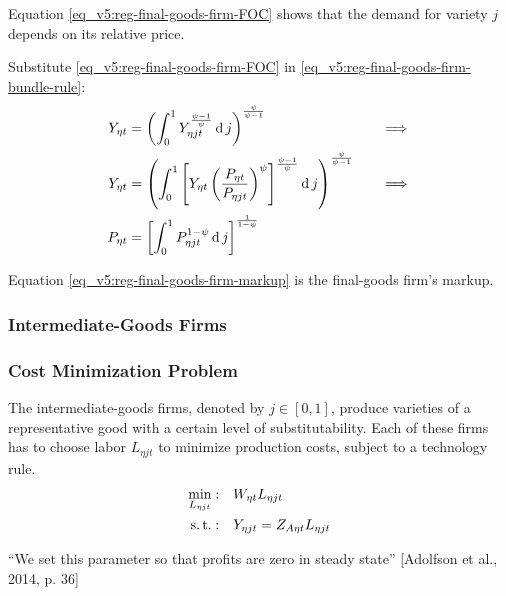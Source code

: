 \documentclass[../thesis.tex]{subfiles}
\begin{document}
Equation \ref{eq_v5:reg-final-goods-firm-FOC} shows that the demand for variety $j$ depends on its relative price. 

Substitute \ref{eq_v5:reg-final-goods-firm-FOC} in \ref{eq_v5:reg-final-goods-firm-bundle-rule}:
\begin{alignat}{2}
	Y_{\eta t} & = \left( \int_{0}^{1} Y_{\eta jt}^{\frac{\psi-1}{\psi}} \operatorname{d} j \right)^{\frac{\psi}{\psi-1}} &\implies \nonumber \\
	Y_{\eta t} & = \left( \int_{0}^{1} \left[ Y_{\eta t} \left( \frac{P_{\eta t}}{P_{\eta jt}} \right)^{\psi} \right]^{\frac{\psi-1}{\psi}} \operatorname{d} j \right)^{\frac{\psi}{\psi-1}} \quad &\implies \nonumber \\
	P_{\eta t} & = \left[ \int_{0}^{1} P_{\eta jt}^{1-\psi} \operatorname{d} j \right]^{\frac{1}{1-\psi}} \label{eq_v5:reg-final-goods-firm-markup}
\end{alignat}

Equation \ref{eq_v5:reg-final-goods-firm-markup} is the final-goods firm's markup.


\subsubsection{Intermediate-Goods Firms}

\subsubsection*{Cost Minimization Problem}

The intermediate-goods firms, denoted by $j \in [0,1]$, produce varieties of a representative good with a certain level of substitutability. Each of these firms has to choose labor $L_{\eta jt}$ to minimize production costs, subject to a technology rule.
\begin{align}
	\label{eq_v5:reg-int-good-firm-total-cost}
	\min_{L_{\eta jt}}: \quad & W_{\eta t} L_{\eta jt} \\
	\label{eq_v5:reg-int-good-firm-production-function}
	\operatorname{s.t.}: \quad & Y_{\eta jt} = Z_{A\eta t} L_{\eta jt}
\end{align}

\begin{tcolorbox}[colback=red!5!white,colframe=red!75!black]
	
	“We set this parameter so that profits are zero in steady state” [Adolfson et al., 2014, p. 36]
	
\end{tcolorbox}
\end{document}
